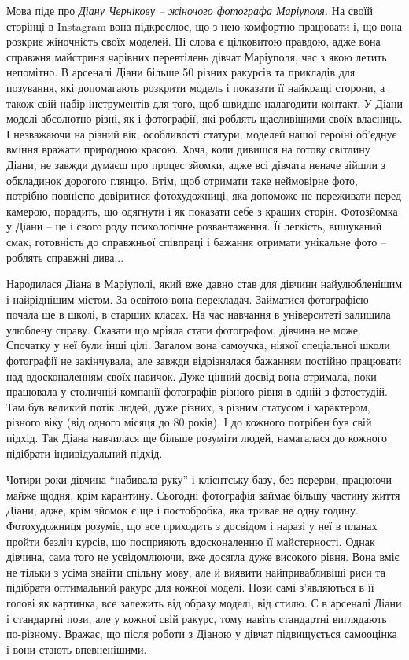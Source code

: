 Мова піде про \emph{Діану Чернікову – жіночого фотографа Маріуполя.} На своїй сторінці
в Instagram вона підкреслює, що з нею комфортно працювати і, що вона розкриє
жіночність своїх моделей. Ці слова є цілковитою правдою, адже вона справжня
майстриня чарівних перевтілень дівчат Маріуполя, час з якою летить непомітно. В
арсеналі Діани більше 50 різних ракурсів та прикладів для позування, які
допомагають розкрити модель і показати її найкращі сторони, а також свій набір
інструментів для того, щоб швидше налагодити контакт. У Діани моделі абсолютно
різні, як і фотографії, які роблять щасливішими своїх власниць. І незважаючи на
різний вік, особливості статури, моделей нашої героїні об'єднує вміння вражати
природною красою. Хоча, коли дивишся на готову світлину Діани, не завжди думаєш
про процес зйомки, адже всі дівчата неначе зійшли з обкладинок дорогого глянцю.
Втім, щоб отримати таке неймовірне фото, потрібно повністю довіритися
фотохудожниці, яка допоможе не переживати перед камерою, порадить, що одягнути
і як показати себе з кращих сторін. Фотозйомка у Діани – це і свого роду
психологічне розвантаження. Її легкість, вишуканий смак, готовність до
справжньої співпраці і бажання отримати унікальне фото – роблять справжні
дива...


Народилася Діана в Маріуполі, який вже давно став для дівчини найулюбленішим і
найріднішим містом. За освітою вона перекладач. Займатися фотографією почала ще
в школі, в старших класах. На час навчання в університеті залишила улюблену
справу. Сказати що мріяла стати фотографом, дівчина не може. Спочатку у неї
були інші цілі. Загалом вона самоучка, ніякої спеціальної школи фотографії не
закінчувала, але завжди відрізнялася бажанням постійно працювати над
вдосконаленням своїх навичок. Дуже цінний досвід вона отримала, поки працювала
у столичній компанії фотографів різного рівня в одній з фотостудій. Там був
великий потік людей, дуже різних, з різним статусом і характером, різного віку
(від одного місяця до 80 років). І до кожного потрібен був свій підхід. Так
Діана навчилася ще більше розуміти людей, намагалася до кожного підібрати
індивідуальний підхід.


Чотири роки дівчина \enquote{набивала руку} і клієнтську базу, без перерви, працюючи
майже щодня, крім карантину. Сьогодні фотографія займає більшу частину життя
Діани, адже, крім зйомок є ще і постобробка, яка триває не одну годину.
Фотохудожниця розуміє, що все приходить з досвідом і наразі у неї в планах
пройти безліч курсів, що посприяють вдосконаленню її майстерності. Однак
дівчина, сама того не усвідомлюючи, вже досягла дуже високого рівня. Вона вміє
не тільки з усіма знайти спільну мову, але й виявити найпривабливіші риси та
підібрати оптимальний ракурс для кожної моделі. Пози самі з'являються в її
голові як картинка, все залежить від образу моделі, від стилю. Є в арсеналі
Діани і стандартні пози, але у кожної свій ракурс, тому навіть стандартні
виглядають по-різному. Вражає, що після роботи з Діаною у дівчат підвищується
самооцінка і вони стають впевненішими.


